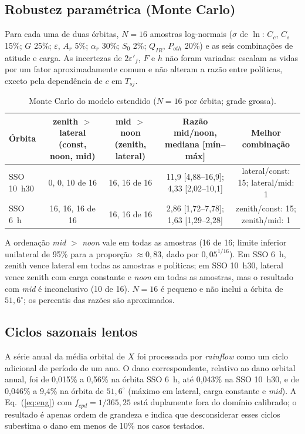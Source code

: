 \documentclass[12pt,a4paper]{article}
\begin{document}
\subsection{Robustez paramétrica (Monte Carlo)}\label{sec:mcext}
Para cada uma de duas órbitas, $N=16$ amostras log-normais ($\sigma$ de $\ln$:
$C_c$, $C_s$ 15\%; $G$ 25\%; $\varepsilon$, $A_r$ 5\%; $\alpha_r$ 30\%;
$S_0$ 2\%; $Q_{IR}$, $P_{oth}$ 20\%) e as seis combinações de atitude e carga.
As incertezas de $2\varepsilon'_f$, $F$ e $h$ não foram variadas: escalam as
vidas por um fator aproximadamente comum e não alteram a razão entre políticas,
exceto pela dependência de $c$ em $T_{sj}$.
\begin{table}[h]\centering\small
\caption{Monte Carlo do modelo estendido ($N=16$ por órbita; grade grossa).}
\label{tab:mcext}
\begin{tabular}{@{}lcccc@{}}\toprule
Órbita & zenith $>$ lateral (const, noon, mid) & mid $>$ noon (zenith, lateral) & Razão mid/noon, mediana [mín--máx] & Melhor combinação\\\midrule
SSO 10~h30 & 0, 0, 10 de 16 & 16, 16 de 16 & 11,9 [4,88--16,9]; 4,33 [2,02--10,1] & lateral/const: 15; lateral/mid: 1\\
SSO 6~h & 16, 16, 16 de 16 & 16, 16 de 16 & 2,86 [1,72--7,78]; 1,63 [1,29--2,28] & zenith/const: 15; zenith/mid: 1\\
\bottomrule\end{tabular}\end{table}
A ordenação \emph{mid} $>$ \emph{noon} vale em todas as amostras
(16 de 16; limite inferior unilateral de 95\% para a proporção $\approx0{,}83$,
dado por $0{,}05^{1/16}$). Em SSO 6~h, zenith vence lateral em todas as
amostras e políticas; em SSO 10~h30, lateral vence zenith com carga constante
e \emph{noon} em todas as amostras, mas o resultado com \emph{mid} é
inconclusivo (10 de 16). $N=16$ é pequeno e não inclui a órbita de
$51{,}6^\circ$; os percentis das razões são aproximados.

\subsection{Ciclos sazonais lentos}
A série anual da média orbital de $X$ foi processada por \emph{rainflow} como
um ciclo adicional de período de um ano. O dano correspondente, relativo ao
dano orbital anual, foi de 0,015\% a 0,56\% na órbita SSO 6~h, até 0,043\% na
SSO 10~h30, e de 0,046\% a 9,4\% na órbita de $51{,}6^\circ$ (máximo em
lateral, carga constante e \emph{mid}). A Eq.~(\ref{eq:eng}) com
$f_{cpd}=1/365{,}25$ está duplamente fora do domínio calibrado; o resultado é
apenas ordem de grandeza e indica que desconsiderar esses ciclos subestima o
dano em menos de 10\% nos casos testados.
\end{document}
